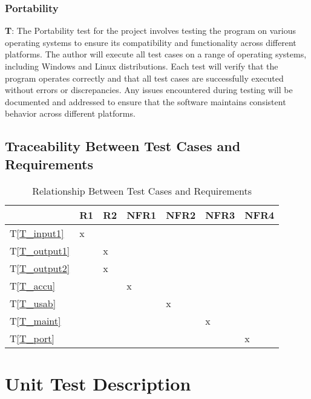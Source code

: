 \documentclass[12pt, titlepage]{article}
\newcounter{testCase}
\newcommand{\testCaseFormat}{T\thetestCase}
\newcommand{\tref}[1]{T\ref{#1}}
\begin{document}
\subsubsection{Portability}\label{subsec:Portability}
 \textbf{\testCaseFormat \label{T_port}}: The Portability test for the project involves testing the program on various operating systems to ensure its compatibility and functionality across different platforms. The author will execute all test cases on a range of operating systems, including Windows and Linux distributions. Each test will verify that the program operates correctly and that all test cases are successfully executed without errors or discrepancies. Any issues encountered during testing will be documented and addressed to ensure that the software maintains consistent behavior across different platforms. 

\subsection{Traceability Between Test Cases and Requirements}

\begin{table}[H]
\centering
\begin{tabular}{|l|l|l|l|l|l|l|}
\hline
& R1 & R2 & NFR1 & NFR2 & NFR3 & NFR4 \\ \hline
\tref{T_input1} & x & & & & & \\ \hline
\tref{T_output1} & & x & & & & \\ \hline
\tref{T_output2} & & x & & & & \\ \hline
\tref{T_accu} & & &x & & & \\ \hline
\tref{T_usab} & & & &x & & \\ \hline
\tref{T_maint} & & & & &x & \\ \hline
\tref{T_port} & & & & & &x \\ \hline
\end{tabular}
\caption{Relationship Between Test Cases and Requirements}
\label{tab:traceability}
\end{table}

\section{Unit Test Description}


\end{document}
